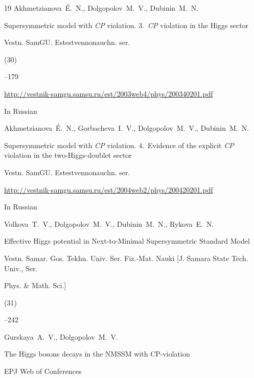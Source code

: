 \begin{thebibliography}{19}
\by Akhmetzianova~\'E.~N., Dolgopolov~M.~V., Dubinin~M.~N.

\paper Supersymmetric model with {\it CP} violation. 3.~{\it CP} violation in the Higgs sector

\jour Vestn. SamGU. Estestvennonauchn. ser.


(30)

--179

\elink \url{http://vestnik-samgu.samsu.ru/est/2003web4/phys/200340201.pdf}




\lang In Russian

\by Akhmetzianova~\'E.~N., Gorbacheva~I.~V., Dolgopolov~M.~V., Dubinin~M.~N.

\paper Supersymmetric model with {\it CP} violation. 4.~Evidence  of  the  explicit {\it CP} violation in  the  two-Higgs-doublet  sector

\jour Vestn. SamGU. Estestvennonauchn. ser.

\elink \url{http://vestnik-samgu.samsu.ru/est/2004web2/phys/200420201.pdf}




\lang In Russian

\by Volkova~T.~V., Dolgopolov~M.~V., Dubinin~M.~N., Rykova~E.~N.

\paper Effective Higgs potential in Next-to-Minimal Supersymmetric Standard Model

\jour Vestn. Samar. Gos. Tekhn. Univ. Ser. Fiz.-Mat. Nauki \rm [J. Samara State Tech. Univ., Ser.

Phys. \& Math. Sci.]


(31)

--242








\by Gurskaya~A.~V., Dolgopolov~M.~V.

\paper The Higgs bosons decays in the NMSSM with CP-violation

\jour EPJ Web of Conferences



\end{thebibliography}
